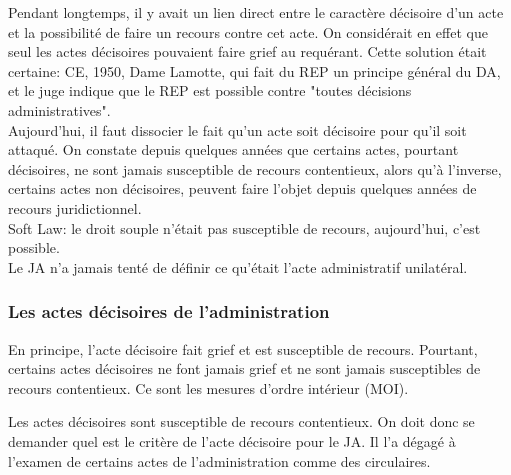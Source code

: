 \documentclass[10pt, a4paper, openany]{book}
\begin{document}
Pendant longtemps, il y avait un lien direct entre le caractère décisoire d'un acte et la possibilité de faire un recours contre cet acte. On considérait en effet que seul les actes décisoires pouvaient faire grief au requérant. Cette solution était certaine: CE, 1950, Dame Lamotte, qui fait du REP un principe général du DA, et le juge indique que le REP est possible contre "toutes décisions administratives". \\
Aujourd'hui, il faut dissocier le fait qu'un acte soit décisoire pour qu'il soit attaqué. On constate depuis quelques années que certains actes, pourtant décisoires, ne sont jamais susceptible de recours contentieux, alors qu'à l'inverse, certains actes non décisoires, peuvent faire l'objet depuis quelques années de recours juridictionnel. \\
Soft Law: le droit souple n'était pas susceptible de recours, aujourd'hui, c'est possible. \\
Le JA n'a jamais tenté de définir ce qu'était l'acte administratif unilatéral. 

\subsubsection{Les actes décisoires de l'administration}

En principe, l'acte décisoire fait grief et est susceptible de recours. Pourtant, certains actes décisoires ne font jamais grief et ne sont jamais susceptibles de recours contentieux. Ce sont les mesures d'ordre intérieur (MOI). 


Les actes décisoires sont susceptible de recours contentieux. On doit donc se demander quel est le critère de l'acte décisoire pour le JA. Il l'a dégagé à l'examen de certains actes de l'administration comme des circulaires.
\end{document}
